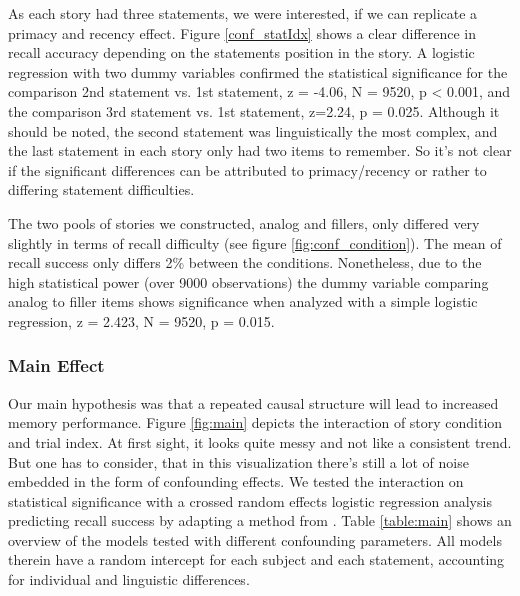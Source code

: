 \documentclass[a4paper,man,natbib,floatsintext,import]{apa6}
\begin{document}
As each story had three statements, we were interested, if we can replicate a primacy and recency effect. Figure \ref{conf_statIdx} shows a clear difference in recall accuracy depending on the statements position in the story. A logistic regression with two dummy variables confirmed the statistical significance for the comparison 2nd statement vs. 1st statement, z = -4.06, N = 9520, p < 0.001, and the comparison 3rd statement vs. 1st statement, z=2.24, p = 0.025. Although it should be noted, the second statement was linguistically the most complex, and the last statement in each story only had two items to remember. So it's not clear if the significant differences can be attributed to primacy/recency or rather to differing statement difficulties.

The two pools of stories we constructed, analog and fillers, only differed very slightly in terms of recall difficulty (see figure \ref{fig:conf_condition}). The mean of recall success only differs 2\% between the conditions. Nonetheless, due to the high statistical power (over 9000 observations) the dummy variable comparing analog to filler items shows significance when analyzed with a simple logistic regression, z = 2.423, N = 9520, p = 0.015.

\subsubsection{Main Effect}
Our main hypothesis was that a repeated causal structure will lead to increased memory performance. Figure \ref{fig:main} depicts the interaction of story condition and trial index. At first sight, it looks quite messy and not like a consistent trend. But one has to consider, that in this visualization there's still a lot of noise embedded in the form of confounding effects. We tested the interaction on statistical significance with a crossed random effects logistic regression analysis predicting recall success by adapting a method from \cite{Baayen2008}. Table \ref{table:main} shows an overview of the models tested with different confounding parameters. All models therein have a random intercept for each subject and each statement, accounting for individual and linguistic differences.
\end{document}
